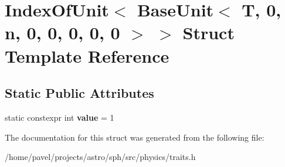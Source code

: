 \hypertarget{structIndexOfUnit_3_01BaseUnit_3_01T_00_010_00_01n_00_010_00_010_00_010_00_010_00_010_01_4_01_4}{}\section{Index\+Of\+Unit$<$ Base\+Unit$<$ T, 0, n, 0, 0, 0, 0, 0 $>$ $>$ Struct Template Reference}
\label{structIndexOfUnit_3_01BaseUnit_3_01T_00_010_00_01n_00_010_00_010_00_010_00_010_00_010_01_4_01_4}
\subsection*{Static Public Attributes}
\begin{DoxyCompactItemize}
\item 
\hypertarget{structIndexOfUnit_3_01BaseUnit_3_01T_00_010_00_01n_00_010_00_010_00_010_00_010_00_010_01_4_01_4_a6203bafbbabea2669e7e291c609cccf2}{}\label{structIndexOfUnit_3_01BaseUnit_3_01T_00_010_00_01n_00_010_00_010_00_010_00_010_00_010_01_4_01_4_a6203bafbbabea2669e7e291c609cccf2} 
static constexpr int {\bfseries value} = 1
\end{DoxyCompactItemize}


The documentation for this struct was generated from the following file\+:\begin{DoxyCompactItemize}
\item 
/home/pavel/projects/astro/sph/src/physics/traits.\+h\end{DoxyCompactItemize}
